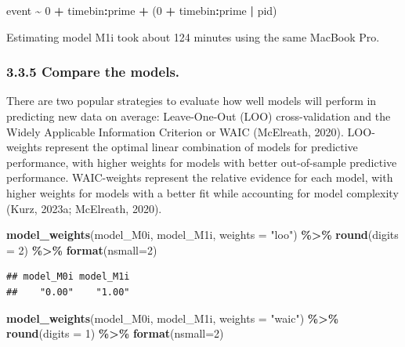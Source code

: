 \documentclass[
  man, donotrepeattitle,floatsintext]{apa6}
\newenvironment{Shaded}{\begin{snugshade}}{\end{snugshade}}
\newcommand{\AttributeTok}[1]{\textcolor[rgb]{0.13,0.29,0.53}{#1}}
\newcommand{\DecValTok}[1]{\textcolor[rgb]{0.00,0.00,0.81}{#1}}
\newcommand{\FunctionTok}[1]{\textcolor[rgb]{0.13,0.29,0.53}{\textbf{#1}}}
\newcommand{\NormalTok}[1]{#1}
\newcommand{\SpecialCharTok}[1]{\textcolor[rgb]{0.81,0.36,0.00}{\textbf{#1}}}
\newcommand{\StringTok}[1]{\textcolor[rgb]{0.31,0.60,0.02}{#1}}
\begin{document}
\begin{Shaded}
\begin{Highlighting}[]
\NormalTok{event }\SpecialCharTok{\textasciitilde{}} \DecValTok{0} \SpecialCharTok{+}\NormalTok{ timebin}\SpecialCharTok{:}\NormalTok{prime }\SpecialCharTok{+}\NormalTok{ (}\DecValTok{0} \SpecialCharTok{+}\NormalTok{ timebin}\SpecialCharTok{:}\NormalTok{prime }\SpecialCharTok{|}\NormalTok{ pid)}
\end{Highlighting}
\end{Shaded}

Estimating model M1i took about 124 minutes using the same MacBook Pro.

\subsubsection{3.3.5 Compare the models.}\label{compare-the-models.}

There are two popular strategies to evaluate how well models will perform in predicting new data on average: Leave-One-Out (LOO) cross-validation and the Widely Applicable Information Criterion or WAIC (McElreath, 2020). LOO-weights represent the optimal linear combination of models for predictive performance, with higher weights for models with better out-of-sample predictive performance. WAIC-weights represent the relative evidence for each model, with higher weights for models with a better fit while accounting for model complexity (Kurz, 2023a; McElreath, 2020).

\footnotesize

\begin{Shaded}
\begin{Highlighting}[]
\FunctionTok{model\_weights}\NormalTok{(model\_M0i, model\_M1i, }\AttributeTok{weights =} \StringTok{"loo"}\NormalTok{) }\SpecialCharTok{\%\textgreater{}\%} \FunctionTok{round}\NormalTok{(}\AttributeTok{digits =} \DecValTok{2}\NormalTok{) }\SpecialCharTok{\%\textgreater{}\%} \FunctionTok{format}\NormalTok{(}\AttributeTok{nsmall=}\DecValTok{2}\NormalTok{)}
\end{Highlighting}
\end{Shaded}

\begin{verbatim}
## model_M0i model_M1i 
##    "0.00"    "1.00"
\end{verbatim}

\begin{Shaded}
\begin{Highlighting}[]
\FunctionTok{model\_weights}\NormalTok{(model\_M0i, model\_M1i, }\AttributeTok{weights =} \StringTok{"waic"}\NormalTok{) }\SpecialCharTok{\%\textgreater{}\%} \FunctionTok{round}\NormalTok{(}\AttributeTok{digits =} \DecValTok{1}\NormalTok{) }\SpecialCharTok{\%\textgreater{}\%} \FunctionTok{format}\NormalTok{(}\AttributeTok{nsmall=}\DecValTok{2}\NormalTok{)}
\end{Highlighting}
\end{Shaded}
\end{document}
